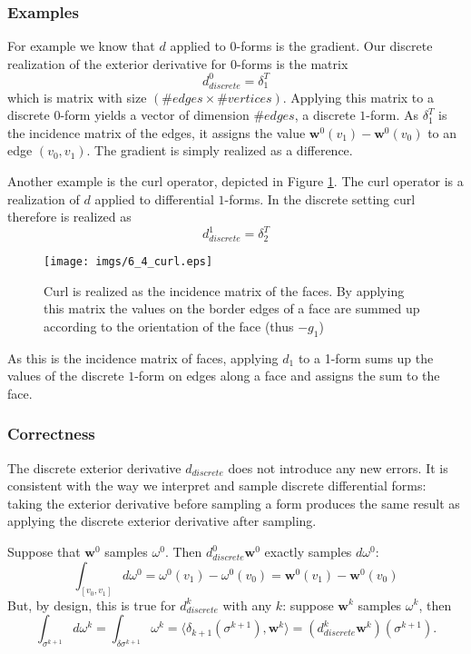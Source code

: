 \subsubsection{Examples}
For example we know that $d$ applied to $0$-forms is the gradient. Our discrete realization of the exterior derivative for $0$-forms is the matrix
\[d_{discrete}^0 = \delta_1^T\]
which is matrix with size $(\# edges \times \#vertices)$. Applying this matrix to a discrete $0$-form yields a vector of dimension $\# edges$, a discrete $1$-form. As $\delta_1^T$ is the incidence matrix of the edges, it assigns the value $\textbf{w}^0(v_1) - \textbf{w}^0(v_0)$ to an edge $(v_0,v_1)$. The gradient is simply realized as a difference.

Another example is the curl operator, depicted in Figure \ref{fig::6_1_curl}. The curl operator is a realization of $d$ applied to differential $1$-forms. In the discrete setting curl therefore is realized as
\[d_{discrete}^1 = \delta_2^T\]
\begin{figure}[t]
\begin{center}
\texttt{[image: imgs/6\_4\_curl.eps]}
\end{center}
\caption{Curl is realized as the incidence matrix of the faces. By applying this matrix the values on the border edges of a face are summed up according to the orientation of the face (thus $-g_1$)}
\label{fig::6_1_curl}
\end{figure}

\noindent As this is the incidence matrix of faces, applying $d_1$ to a 1-form sums up the values of the discrete $1$-form on edges along a face and assigns the sum to the face. 

\subsubsection{Correctness}
The discrete exterior derivative $d_{discrete}$ does not introduce any new errors. It is consistent with the way we interpret and sample discrete differential forms: taking the exterior derivative before sampling a form produces the same result as applying the discrete exterior derivative after sampling.

Suppose that $\textbf{w}^0$ samples $\omega^0$. Then $d_{discrete}^0 \textbf{w}^0$ exactly samples $d\omega^0$:
\[\int_{[v_0,v_1]} d\omega^0 = \omega^0(v_1) - \omega^0(v_0)= \textbf{w}^0(v_1) - \textbf{w}^0(v_0)\] 
But, by design, this is true for $d_{discrete}^k$ with any $k$: suppose $\textbf{w}^k$ samples $\omega^k$, then
\[\int_{\sigma^{k+1}} d\omega^k  = \int_{\delta \sigma^{k+1}} \omega^k = \langle \delta_{k+1}(\sigma^{k+1}), \textbf{w}^k\rangle = (d_{discrete}^{k} \textbf{w}^k) (\sigma^{k+1}).\]

